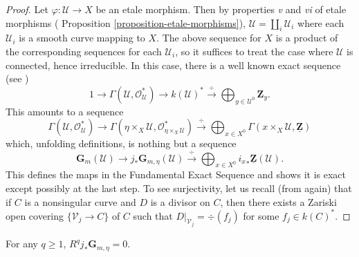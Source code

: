 \begin{proof}
Let $\varphi : \mathcal{U} \to X$ be an etale morphism. Then by properties
{\it v} and {\it vi} of etale morphisms (
Proposition \ref{proposition-etale-morphisms}),
$\mathcal{U} = \coprod_i \mathcal{U}_i$ where
each $\mathcal{U}_i$ is a smooth curve mapping to $X$. The above sequence for
$X$ is a product of the corresponding sequences for each $\mathcal{U}_i$, so it
suffices to treat the case where $\mathcal{U}$ is connected, hence irreducible.
In this case, there is a well known exact sequence (see \cite{H})
$$
1 \longrightarrow
\Gamma(\mathcal{U},\mathcal{O}_\mathcal{U}^*) \longrightarrow
k(\mathcal{U})^* \xrightarrow{\ \div\ }
\bigoplus_{y \in \mathcal{U}^0} \mathbf{Z}_y.
$$
This amounts to a sequence
$$
\Gamma(\mathcal{U},\mathcal{O}_\mathcal{U}^*) \longrightarrow
\Gamma(\eta\times_X\mathcal{U},\mathcal{O}_{\eta\times_X\mathcal{U}}^*)
\xrightarrow{\ \div\ } \bigoplus_{x \in X^0}
\Gamma(x\times_X\mathcal{U},\underline{\mathbf{Z}})
$$
which, unfolding definitions, is nothing but a sequence
$$
\mathbf{G}_m(\mathcal{U}) \longrightarrow j_* \mathbf{G}_{m,\eta}(\mathcal{U})
\xrightarrow{\ \div\ } \bigoplus_{x \in X^0} {i_x}_* \underline{\mathbf{Z}}
(\mathcal{U}).
$$
This defines the maps in the Fundamental Exact Sequence and shows it is exact
except possibly at the last step. To see surjectivity, let us recall (from
\cite{H} again) that if $C$ is a nonsingular curve and $D$ is a divisor on $C$,
then there exists a Zariski open covering $\{ \mathcal{V}_j \to C \}$ of $C$
such that $D |_{\mathcal{V}_j} = \div(f_j)$ for some $f_j \in k(C)^*$.
\end{proof}

\begin{lemma}
\label{lemma-higher-direct-jstar-Gm}
For any $q \geq 1$, $R^q j_*\mathbf{G}_{m,\eta} = 0$.
\end{lemma}

